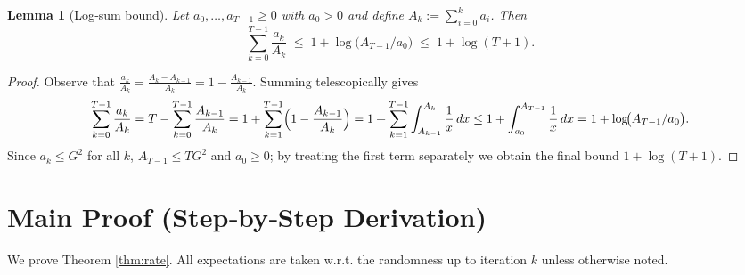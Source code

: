 \documentclass[11pt]{article}
\newtheorem{lemma}{Lemma}
\begin{document}
\begin{lemma}[Log‑sum bound]\label{lem:logsum}
Let $a_0,\dots,a_{T-1}\ge0$ with $a_0>0$ and define $A_k:=\sum_{i=0}^{k}a_i$. Then
\[
\sum_{k=0}^{T-1}\frac{a_k}{A_k}\;\le\;1+\log\!\bigl(A_{T-1}/a_0\bigr)
\;\le\;1+\log (T+1).
\]
\end{lemma}
\begin{proof}
Observe that $\frac{a_k}{A_k}= \frac{A_k-A_{k-1}}{A_k}=1-\frac{A_{k-1}}{A_k}$. Summing telescopically gives
\[
\sum_{k=0}^{T-1}\frac{a_k}{A_k}=T-\sum_{k=0}^{T-1}\frac{A_{k-1}}{A_k}
=1+\sum_{k=1}^{T-1}\Bigl(1-\frac{A_{k-1}}{A_k}\Bigr)
=1+\sum_{k=1}^{T-1}\int_{A_{k-1}}^{A_k}\frac{1}{x}\,dx
\le 1+\int_{a_0}^{A_{T-1}}\frac{1}{x}\,dx
=1+\log\!\bigl(A_{T-1}/a_0\bigr).
\]
Since $a_k\le G^{2}$ for all $k$, $A_{T-1}\le T G^{2}$ and $a_0\ge0$; by treating the first term separately we obtain the final bound $1+\log (T+1)$. \qedhere
\end{proof}

\section*{Main Proof (Step‑by‑Step Derivation)}
We prove Theorem \ref{thm:rate}. All expectations are taken w.r.t. the randomness up to iteration $k$ unless otherwise noted.
\end{document}
